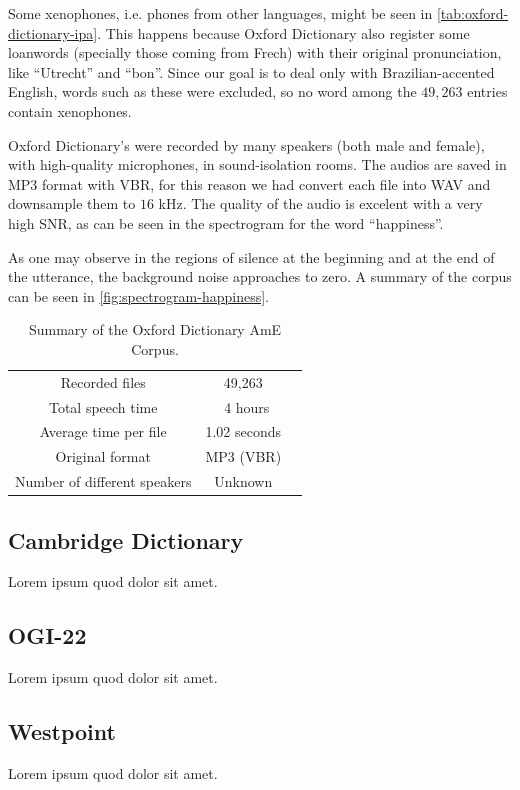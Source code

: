 Some xenophones, i.e. phones from other languages, might be seen in \autoref{tab:oxford-dictionary-ipa}. This happens because
Oxford Dictionary also register some loanwords (specially those coming from Frech) with their original pronunciation,
like ``Utrecht'' and ``bon''. Since our goal is to deal only with Brazilian-accented English, words such as these
were excluded, so no word among the $49,263$ entries contain xenophones.

Oxford Dictionary's were recorded by many speakers (both male and female), with high-quality microphones, in sound-isolation rooms.
The audios are saved in MP3 format with \ac{VBR}, for this reason we had convert each file into WAV and downsample them to $16$ kHz.
The quality of the audio is excelent with a very high \ac{SNR}, as can be seen in the spectrogram for the word ``happiness''.

As one may observe in the regions of silence at the beginning and at the end of the utterance, the background noise approaches to zero.
A summary of the corpus can be seen in \autoref{fig:spectrogram-happiness}.

\begin{table}[H]
\caption[Summary of the Oxford Dictionary AmE Corpus.]{Summary of the Oxford Dictionary AmE Corpus.}
\smallskip
\centering
\begin{tabular}{ccc} \toprule
 Recorded files & 49,263 \\
 Total speech time & ~4 hours \\
 Average time per file & 1.02 seconds \\
 Original format & MP3 (VBR) \\
 Number of different speakers & Unknown \\
 \bottomrule
\end{tabular}
\label{tab:oxford-summary}
\end{table}

\clearpage
\subsection{Cambridge Dictionary}
Lorem ipsum quod dolor sit amet.

\subsection{OGI-22}
Lorem ipsum quod dolor sit amet.

\subsection{Westpoint}
Lorem ipsum quod dolor sit amet.

